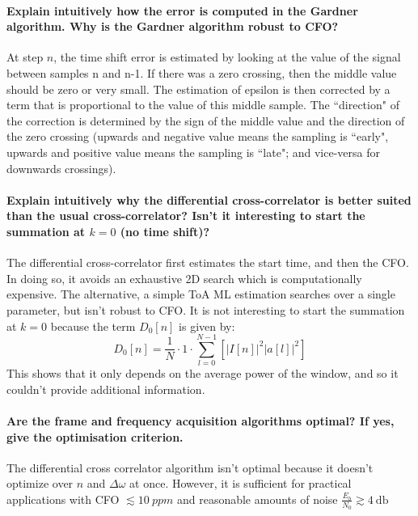 \paragraph{Explain intuitively how the error is computed in the Gardner algorithm. Why is the
Gardner algorithm robust to CFO?} At step $n$, the time shift error is estimated by looking at the value of the signal between samples n and n-1. If there was a zero crossing, then the middle value should be zero or very small. The estimation of epsilon is then corrected by a term that is proportional to the value of this middle sample. The ``direction" of the correction is determined by the sign of the middle value and the direction of the zero crossing (upwards and negative value means the sampling is ``early", upwards and positive value means the sampling is ``late"; and vice-versa for downwards crossings).

\paragraph{Explain intuitively why the differential cross-correlator is better suited than the usual cross-correlator? Isn’t it interesting to start the summation at $k = 0$ (no time shift)?}
The differential cross-correlator first estimates the start time, and then the CFO. In doing so, it avoids an exhaustive 2D search which is computationally expensive. The alternative, a simple ToA ML estimation searches over a single parameter, but isn't robust to CFO.
It is not interesting to start the summation at $k = 0$ because the term $D_0[n]$ is given by:
\[
D_0[n] = \frac{1}{N}\cdot1\cdot\sum_{l=0}^{N-1} \left [ \big | I[n] \big | ^2 \big | a[l] \big | ^2 \right ]
\]
This shows that it only depends on the average power of the window, and so it couldn't provide additional information.

\paragraph{Are the frame and frequency acquisition algorithms optimal? If yes, give the optimisation criterion.}
The differential cross correlator algorithm isn't optimal because it doesn't optimize over $n$ and $\Delta \omega$ at once. However, it is sufficient for practical applications with CFO $\lesssim \SI{10}{ppm}$ and reasonable amounts of noise $\frac{E_b}{N_0} \gtrsim \SI{4}{\decibel}$
